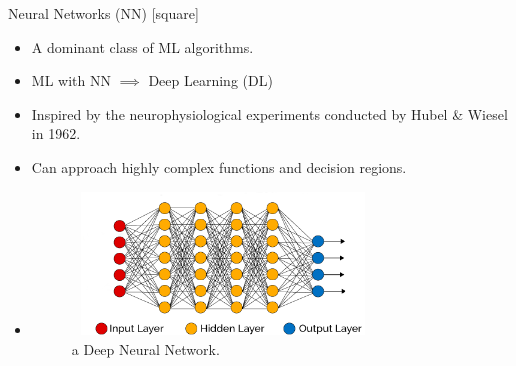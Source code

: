 \begin{frame}{Neural Networks (NN)}
    [square]
    \begin{itemize}
        \item{A dominant class of ML algorithms.}
        \vspace{0.2cm}
        \item{ML with NN $\implies$ Deep Learning (DL)}
        \vspace{0.2cm}
        \item{Inspired by the neurophysiological experiments conducted by Hubel \& Wiesel in 1962.}
        \vspace{0.2cm}
        \item{Can approach highly complex functions and decision regions.}
        \vspace{0.2cm}
        \item[]{
        \begin{figure}[H]
            \centering
            \includegraphics[width=8cm,height=3.8cm]{images/dnn.png}
            \caption{a Deep Neural Network.}
            \label{fig:dnn}
        \end{figure}}
    \end{itemize}
\end{frame}

